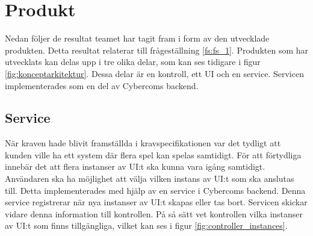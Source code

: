 \section{Produkt}
Nedan följer de resultat teamet har tagit fram i form av den utvecklade produkten. Detta resultat relaterar till frågeställning \ref{fs:fs_1}. Produkten som har utvecklats kan delas upp i tre olika delar, som kan ses tidigare i figur \ref{fig:konceptarkitektur}. Dessa delar är en kontroll, ett UI och en service. Servicen implementerades som en del av Cybercoms backend.

\subsection{Service}
När kraven hade blivit framställda i kravspecifikationen var det tydligt att kunden ville ha ett system där flera spel kan spelas samtidigt. För att förtydliga innebär det att flera instanser av UI:t ska kunna vara igång samtidigt. Användaren ska ha möjlighet att välja vilken instans av UI:t som ska anslutas till. Detta implementerades med hjälp av en service i Cybercoms backend. Denna service registrerar när nya instanser av UI:t skapas eller tas bort. Servicen skickar vidare denna information till kontrollen. På så sätt vet kontrollen vilka instanser av UI:t som finns tillgängliga, vilket kan ses i figur \ref{fig:controller_instances}.

